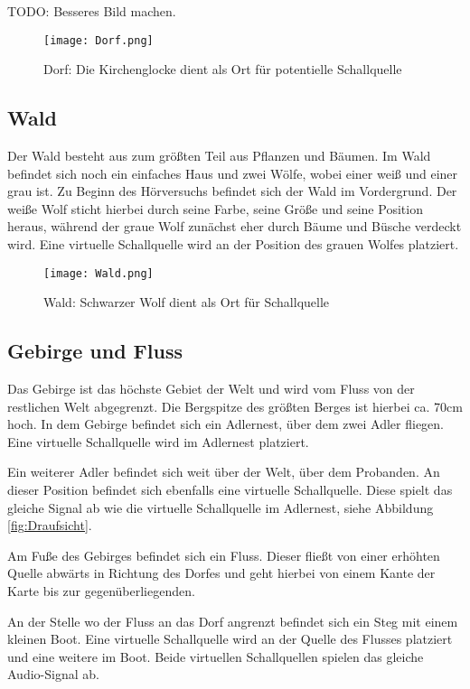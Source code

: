 TODO: Besseres Bild machen. 

 \begin{figure}[H]
\centering
\texttt{[image: Dorf.png]}
\caption{Dorf: Die Kirchenglocke dient als Ort für potentielle Schallquelle}
\label{fig:Dorf}
\end{figure} 

\subsection{Wald}
Der Wald besteht aus zum größten Teil aus Pflanzen und Bäumen. Im Wald befindet sich noch ein einfaches Haus und zwei Wölfe, wobei einer weiß und einer grau ist. Zu Beginn des Hörversuchs befindet sich der Wald im Vordergrund. Der weiße Wolf sticht hierbei durch seine Farbe, seine Größe und seine Position heraus, während der graue Wolf zunächst eher durch Bäume und Büsche verdeckt wird. Eine virtuelle Schallquelle wird an der Position des grauen Wolfes platziert. 

 \begin{figure}[H]
\centering
\texttt{[image: Wald.png]}
\caption{Wald: Schwarzer Wolf dient als Ort für Schallquelle}
\label{fig:Wald}
\end{figure} 

\subsection{Gebirge und Fluss}
Das Gebirge ist das höchste Gebiet der Welt und wird vom Fluss von der restlichen Welt abgegrenzt. Die Bergspitze des größten Berges ist hierbei ca. 70cm hoch. In dem Gebirge befindet sich ein Adlernest, über dem zwei Adler fliegen. Eine virtuelle Schallquelle wird im Adlernest platziert. 

   Ein weiterer Adler befindet sich weit über der Welt, über dem Probanden. An dieser Position befindet sich ebenfalls eine virtuelle Schallquelle. Diese spielt das gleiche Signal ab wie die virtuelle Schallquelle im Adlernest, siehe Abbildung \ref{fig:Draufsicht}. 

Am Fuße des Gebirges befindet sich ein Fluss. Dieser fließt von einer erhöhten Quelle abwärts in Richtung des Dorfes und geht hierbei von einem Kante der Karte bis zur gegenüberliegenden. 

An der Stelle wo der Fluss an das Dorf angrenzt befindet sich ein Steg mit einem kleinen Boot. Eine virtuelle Schallquelle wird an der Quelle des Flusses platziert und eine weitere im Boot. Beide virtuellen Schallquellen spielen das gleiche Audio-Signal ab. 

